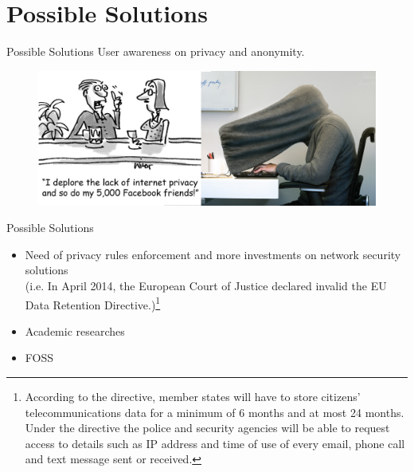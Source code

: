 
\section{Possible Solutions}
\begin{frame}{Possible Solutions}
	User awareness on privacy and anonymity.
	\begin{figure}
		\centering
		\includegraphics[scale=0.50]{imgs/user_privacy.jpg}
	\end{figure}
\end{frame}

\begin{frame}{Possible Solutions}
	\begin{itemize}
		\item Need of privacy rules enforcement and more investments on network
security solutions\\
			\small{(i.e. In April 2014, the European Court of Justice declared
invalid the EU Data Retention Directive.)\footnote{According to the directive, 
member states will have to store citizens' telecommunications data for a minimum 
of 6 months and at most 24 months. Under the directive the police and security 
agencies will be able to request access to details such as IP address and time 
of use of every email, phone call and text message sent or received.}}
		\item Academic researches
		\item FOSS
	\end{itemize}	
\end{frame}

